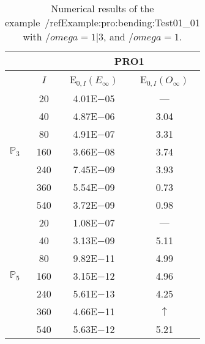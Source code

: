 \begin{table}[H]
\caption{Numerical results of the example~/ref{Example:pro:bending:Test01_01} with $/omega=1|3$, and $/omega=1$.}
\setlength{\tabcolsep}{5pt}
\centering
\begin{tabular}{@{}l c c c@{}}
\toprule
 &  & \multicolumn{2}{c}{PRO1}\\
\midrule
 & $I$ & E$_{0,I}(E_{\infty})$ & E$_{0,I}(O_{\infty})$\\
\midrule
\multirow{7}{*}{$\mathbb{P}_{3}$}
 & 20 & 4.01E$-$05 & ---\\
 & 40 & 4.87E$-$06 & 3.04\\
 & 80 & 4.91E$-$07 & 3.31\\
 & 160 & 3.66E$-$08 & 3.74\\
 & 240 & 7.45E$-$09 & 3.93\\
 & 360 & 5.54E$-$09 & 0.73\\
 & 540 & 3.72E$-$09 & 0.98\\
\midrule
\multirow{7}{*}{$\mathbb{P}_{5}$}
 & 20 & 1.08E$-$07 & ---\\
 & 40 & 3.13E$-$09 & 5.11\\
 & 80 & 9.82E$-$11 & 4.99\\
 & 160 & 3.15E$-$12 & 4.96\\
 & 240 & 5.61E$-$13 & 4.25\\
 & 360 & 4.66E$-$11 & $\uparrow$\\
 & 540 & 5.63E$-$12 & 5.21\\
\bottomrule
\end{tabular}
\label{Table:pRO:test_01_01_test6_pro3}
\end{table}
